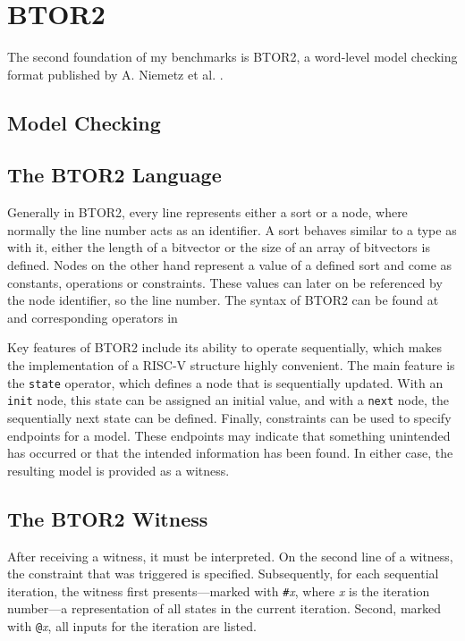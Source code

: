 \chapter{BTOR2}\label{chap:btor2}

The second foundation of my benchmarks is BTOR2, a word-level model
checking format published by A. Niemetz et al. \cite{btor2}.

\section{Model Checking}

\section{The BTOR2 Language}
Generally in BTOR2, every line represents either a sort or a node,
where normally the line number acts as an identifier. A sort behaves
similar to a type as with it, either the length of a bitvector or the
size of an array of bitvectors is defined. Nodes on the other hand
represent a value of a defined sort and come as constants, operations
or constraints. These values can later on be referenced by the node
identifier, so the line number. The syntax of BTOR2 can be found at
\cite[figure 1]{btor2} and corresponding operators in \cite[table
    1]{btor2}

Key features of BTOR2 include its ability to operate sequentially,
which makes the implementation of a RISC-V structure highly
convenient. The main feature is the \texttt{state} operator, which
defines a node that is sequentially updated. With an \texttt{init}
node, this state can be assigned an initial value, and with a
\texttt{next} node, the sequentially next state can be defined.
Finally, constraints can be used to specify endpoints for a model.
These endpoints may indicate that something unintended has occurred
or that the intended information has been found. In either case, the
resulting model is provided as a witness.

\section{The BTOR2 Witness}\label{witness}
After receiving a witness, it must be interpreted. On the second line
of a witness, the constraint that was triggered is specified.
Subsequently, for each sequential iteration, the witness first
presents—marked with \texttt{\#}\textit{x}, where \textit{x} is the
iteration number—a representation of all states in the current
iteration. Second, marked with \texttt{@}\textit{x}, all inputs for
the iteration are listed.

